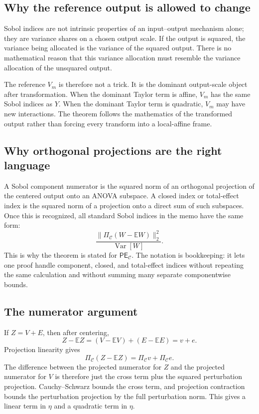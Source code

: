 \documentclass[11pt,letterpaper]{article}
\DeclareMathOperator{\Var}{Var}
\newcommand{\E}{\mathbb{E}}
\theoremstyle{remark}
\begin{document}
\subsection*{Why the reference output is allowed to change}

Sobol indices are not intrinsic properties of an input--output mechanism alone;
they are variance shares on a chosen output scale. If the output is squared, the
variance being allocated is the variance of the squared output. There is no
mathematical reason that this variance allocation must resemble the variance
allocation of the unsquared output.

The reference $V_m$ is therefore not a trick. It is the dominant output-scale
object after transformation. When the dominant Taylor term is affine, $V_m$ has
the same Sobol indices as $Y$. When the dominant Taylor term is quadratic,
$V_m$ may have new interactions. The theorem follows the mathematics of the
transformed output rather than forcing every transform into a local-affine frame.

\subsection*{Why orthogonal projections are the right language}

A Sobol component numerator is the squared norm of an orthogonal projection of
the centered output onto an ANOVA subspace. A closed index or total-effect index
is the squared norm of a projection onto a direct sum of such subspaces. Once
this is recognized, all standard Sobol indices in the memo have the same form:
\begin{equation}
  \frac{\|\Pi_{\mathscr C}(W-\E W)\|_2^2}{\Var[W]}.
\end{equation}
This is why the theorem is stated for $\mathsf{PE}_{\mathscr C}$. The notation
is bookkeeping: it lets one proof handle component, closed, and total-effect
indices without repeating the same calculation and without summing many separate
componentwise bounds.

\subsection*{The numerator argument}

If $Z=V+E$, then after centering,
\begin{equation}
  Z-\E Z=(V-\E V)+(E-\E E)=v+e.
\end{equation}
Projection linearity gives
\begin{equation}
  \Pi_{\mathscr C}(Z-\E Z)=\Pi_{\mathscr C}v+\Pi_{\mathscr C}e.
\end{equation}
The difference between the projected numerator for $Z$ and the projected
numerator for $V$ is therefore just the cross term plus the squared perturbation
projection. Cauchy--Schwarz bounds the cross term, and projection contraction
bounds the perturbation projection by the full perturbation norm. This gives a
linear term in $\eta$ and a quadratic term in $\eta$.
\end{document}
